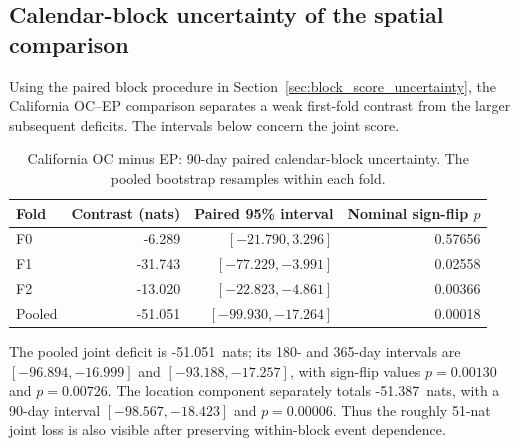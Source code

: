 \subsection{Calendar-block uncertainty of the spatial comparison}
Using the paired block procedure in Section~\ref{sec:block_score_uncertainty}, the California OC--EP
comparison separates a weak first-fold contrast from the larger subsequent
deficits. The intervals below concern the joint score.

\begin{table}[htbp]
\centering
\begin{tabular}{lrrr}
\toprule
Fold & Contrast (nats) & Paired 95\% interval & Nominal sign-flip $p$ \\
\midrule
F0 & -6.289 & $[-21.790,3.296]$ & 0.57656 \\
F1 & -31.743 & $[-77.229,-3.991]$ & 0.02558 \\
F2 & -13.020 & $[-22.823,-4.861]$ & 0.00366 \\
\midrule
Pooled & -51.051 & $[-99.930,-17.264]$ & 0.00018 \\
\bottomrule
\end{tabular}
\caption{California OC minus EP: 90-day paired calendar-block uncertainty. The pooled bootstrap resamples within each fold.}
\label{tab:ca_oc_ep_uncertainty}
\end{table}

The pooled joint deficit is -51.051~nats; its 180- and 365-day intervals are $[-96.894,-16.999]$ and $[-93.188,-17.257]$, with sign-flip values $p=0.00130$ and $p=0.00726$. The location component separately totals -51.387~nats, with a 90-day interval $[-98.567,-18.423]$ and $p=0.00006$. Thus the roughly 51-nat joint loss is also visible after preserving within-block event dependence.
